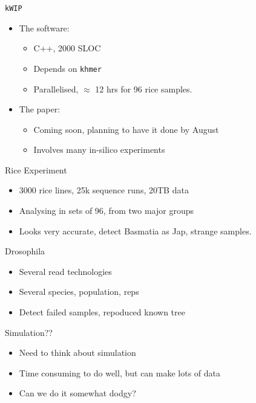 \documentclass[t]{beamer}
\begin{document}
\begin{frame}{\texttt{kWIP}}
  \begin{itemize}
    \item The software:
      \begin{itemize}
        \item C++, 2000 SLOC
        \item Depends on \texttt{khmer}
        \item Parallelised, $\approx$ 12 hrs for 96 rice samples.
      \end{itemize}
    \pause
    \item The paper:
      \begin{itemize}
        \item Coming soon, planning to have it done by August
        \item Involves many in-silico experiments
      \end{itemize}
  \end{itemize}
\end{frame}


\begin{frame}{Rice Experiment}
  \begin{itemize}
    \item 3000 rice lines, 25k sequence runs, 20TB data
    \item Analysing in sets of 96, from two major groups
    \item Looks very accurate, detect Basmatia as Jap, strange samples.
  \end{itemize}
\end{frame}

\begin{frame}{Drosophila}
  \begin{itemize}
    \item Several read technologies
    \item Several species, population, reps
    \item Detect failed samples, repoduced known tree
  \end{itemize}
\end{frame}

\begin{frame}{Simulation??}
  \begin{itemize}
    \item Need to think about simulation
    \item Time consuming to do well, but can make lots of data
    \item Can we do it somewhat dodgy?
  \end{itemize}
\end{frame}
\end{document}
